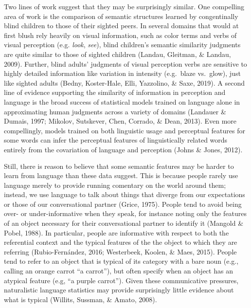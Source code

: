 \documentclass[10pt, letterpaper]{article}
\begin{document}
Two lines of work suggest that they may be surprisingly similar. One
compelling area of work is the comparison of semantic structures learned
by congentinally blind children to those of their sighted peers. In
several domains that would at first blush rely heavily on visual
information, such as color terms and verbs of visual perception (e.g.
\emph{look}, \emph{see}), blind children's semantic similarity judgments
are quite similar to those of sighted children (Landau, Gleitman, \&
Landau, 2009). Further, blind adults' judgments of visual perception
verbs are sensitive to highly detailed information like variation in
intensity (e.g.~blaze vs.~glow), just like sighted adults (Bedny,
Koster-Hale, Elli, Yazzolino, \& Saxe, 2019). A second line of evidence
supporting the similarity of information in perception and language is
the broad success of statistical models trained on language alone in
approximating human judgments across a variety of domains (Landauer \&
Dumais, 1997; Mikolov, Sutskever, Chen, Corrado, \& Dean, 2013). Even
more compellingly, models trained on both linguistic usage and
perceptual features for some words can infer the perceptual features of
linguistically related words entirely from the covariation of language
and perception (Johns \& Jones, 2012).

Still, there is reason to believe that some semantic features may be
harder to learn from language than these data suggest. This is because
people rarely use language merely to provide running comentary on the
world around them; instead, we use language to talk about things that
diverge from our expectations or those of our conversational partner
(Grice, 1975). People tend to avoid being over- or under-informative
when they speak, for instance noting only the features of an object
necessary for their conversational partner to identify it (Mangold \&
Pobel, 1988). In particular, people are informative with respect to both
the referential context and the typical features of the the object to
which they are referring (Rubio-Fernández, 2016; Westerbeek, Koolen, \&
Maes, 2015). People tend to refer to an object that is typical of its
category with a bare noun (e.g., calling an orange carrot ``a carrot''),
but often specify when an object has an atypical feature (e.g, ``a
purple carrot''). Given these communicative pressures, naturalistic
language statistics may provide surprisingly little evidence about what
is typical (Willits, Sussman, \& Amato, 2008).
\end{document}
